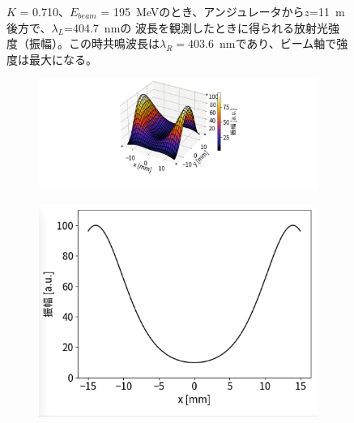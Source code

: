 \documentclass[a4paper,11pt,uplatex]{jsbook}
\begin{document}
\begin{figure}[H]
\begin{subfigure}[h]{0.35\linewidth}
  \end{subfigure}
\caption[共鳴波長でのアンジュレータ放射]{$K$ = 0.710、$E_{beam}$ = 195~MeVのとき、アンジュレータから$z$=11~m後方で、$\lambda_L$=404.7~nmの
波長を観測したときに得られる放射光強度（振幅）。この時共鳴波長は$\lambda_R = 403.6$~nmであり、ビーム軸で強度は最大になる。}\label{fig:resonance}
\end{figure}

\begin{figure}[H]
  \centering
  \begin{subfigure}[h]{\linewidth}
    \centering
    \includegraphics[width=0.9\linewidth]{image/2-spe_nores.png}
  \end{subfigure}
  \hfill
  \vspace{1em}
  \begin{subfigure}[h]{0.35\linewidth}
    \centering
    \includegraphics[width=\linewidth]{image/2-spe_nores_x.png}
  \end{subfigure}
  \hfill
  \begin{subfigure}[h]{0.35\linewidth}

\end{subfigure}
\end{figure}
\end{document}
